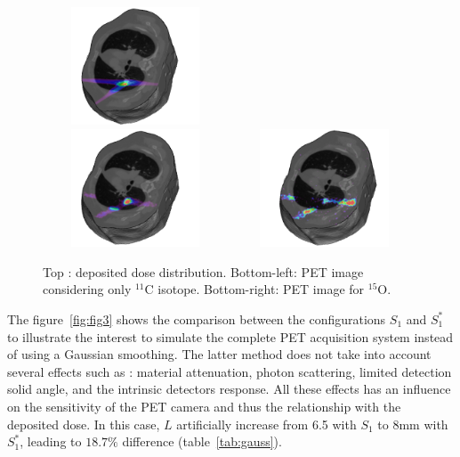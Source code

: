 \documentclass[11pt]{iopart}
\begin{document}
\begin{figure}[!h]
  \centering
  \includegraphics[width=55mm,height=35mm]{figures/3D-Dose_poumon.jpg}\\
  \includegraphics[width=55mm,height=35mm]{figures/3D-PETC11_poumon.jpg}
  \includegraphics[width=55mm,height=35mm]{figures/3D-PETO15_poumon.jpg}
  \caption{Top : deposited dose distribution. Bottom-left: PET image
    considering only $^{11}$C isotope. Bottom-right: PET image for
    $^{15}$O.}
\label{fig:fig1}
\end{figure}

The figure~\ref{fig:fig3} shows the comparison between the
configurations $S_{1}$ and $S_{1}^{*}$ to illustrate the interest to
simulate the complete PET acquisition system instead of using a
Gaussian smoothing. The latter method does not take into account
several effects such as : material attenuation, photon scattering,
limited detection solid angle, and the intrinsic detectors
response. All these effects has an influence on the sensitivity of the
PET camera and thus the relationship with the deposited dose. In this
case, $L$ artificially increase from 6.5 with $S_{1}$ to 8mm with
$S_{1}^{*}$, leading to $18.7 \%$ difference (table~\ref{tab:gauss}).
\end{document}
